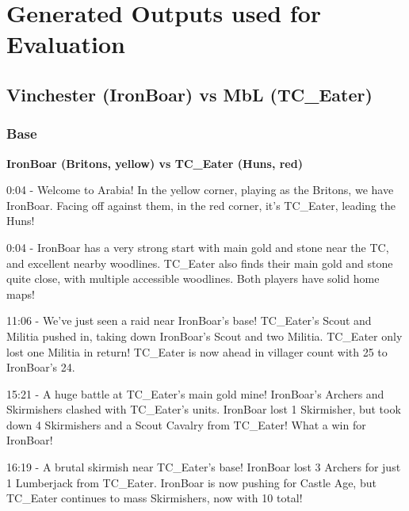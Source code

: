 \chapter{Generated Outputs used for Evaluation}
\label{app:generated-outputs}
\section{Vinchester (IronBoar) vs MbL (TC\_Eater)}
\label{appendix:vinchester-mbl}
\subsection{Base}

\textbf{IronBoar (Britons, yellow) vs TC\_Eater (Huns, red)}

0:04 - Welcome to Arabia! In the yellow corner, playing as the Britons, we have IronBoar. Facing off against them, in the red corner, it's TC\_Eater, leading the Huns! \par \vspace{1em}

0:04 - IronBoar has a very strong start with main gold and stone near the TC, and excellent nearby woodlines. TC\_Eater also finds their main gold and stone quite close, with multiple accessible woodlines. Both players have solid home maps! \par \vspace{1em}

11:06 - We've just seen a raid near IronBoar's base! TC\_Eater's Scout and Militia pushed in, taking down IronBoar's Scout and two Militia. TC\_Eater only lost one Militia in return! TC\_Eater is now ahead in villager count with 25 to IronBoar's 24. \par \vspace{1em}

15:21 - A huge battle at TC\_Eater's main gold mine! IronBoar's Archers and Skirmishers clashed with TC\_Eater's units. IronBoar lost 1 Skirmisher, but took down 4 Skirmishers and a Scout Cavalry from TC\_Eater! What a win for IronBoar! \par \vspace{1em}

16:19 - A brutal skirmish near TC\_Eater's base! IronBoar lost 3 Archers for just 1 Lumberjack from TC\_Eater. IronBoar is now pushing for Castle Age, but TC\_Eater continues to mass Skirmishers, now with 10 total! \par \vspace{1em}

